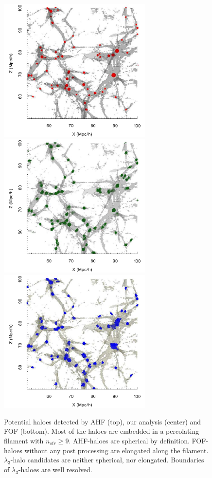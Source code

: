  
\begin{figure}
\centering

\includegraphics[width=7.7cm]{Chapter5/Source_v2/fig12a.pdf}  
\includegraphics[width=7.7cm]{Chapter5/Source_v2/fig12b.pdf}  
\includegraphics[width=7.7cm]{Chapter5/Source_v2/fig12c.pdf} 

\caption{Potential haloes detected by AHF (top), our analysis (center) and FOF (bottom). Most of the haloes are embedded in a percolating filament with $n_{str} \geq 9$. AHF-haloes are spherical by definition. FOF-haloes without any post processing are elongated along the filament. $\lambda_3$-halo candidates are neither spherical, nor elongated. Boundaries of $\lambda_3$-haloes are well resolved.} 
\label{fig:FinderCompare3}
\end{figure}



